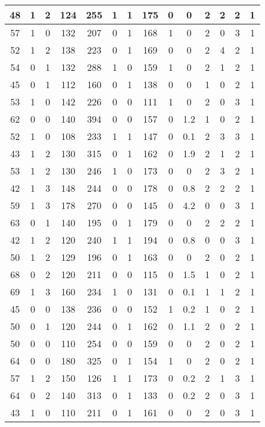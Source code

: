 \documentclass{article}
\begin{document}
\begin{longtable}{|c|c|c|c|c|c|c|c|c|c|c|c|c|c|}
48 & 1 & 2 & 124 & 255 & 1 & 1 & 175 & 0 & 0 & 2 & 2 & 2 & 1 \\ \hline
57 & 1 & 0 & 132 & 207 & 0 & 1 & 168 & 1 & 0 & 2 & 0 & 3 & 1 \\ \hline
52 & 1 & 2 & 138 & 223 & 0 & 1 & 169 & 0 & 0 & 2 & 4 & 2 & 1 \\ \hline
54 & 0 & 1 & 132 & 288 & 1 & 0 & 159 & 1 & 0 & 2 & 1 & 2 & 1 \\ \hline
45 & 0 & 1 & 112 & 160 & 0 & 1 & 138 & 0 & 0 & 1 & 0 & 2 & 1 \\ \hline
53 & 1 & 0 & 142 & 226 & 0 & 0 & 111 & 1 & 0 & 2 & 0 & 3 & 1 \\ \hline
62 & 0 & 0 & 140 & 394 & 0 & 0 & 157 & 0 & 1.2 & 1 & 0 & 2 & 1 \\ \hline
52 & 1 & 0 & 108 & 233 & 1 & 1 & 147 & 0 & 0.1 & 2 & 3 & 3 & 1 \\ \hline
43 & 1 & 2 & 130 & 315 & 0 & 1 & 162 & 0 & 1.9 & 2 & 1 & 2 & 1 \\ \hline
53 & 1 & 2 & 130 & 246 & 1 & 0 & 173 & 0 & 0 & 2 & 3 & 2 & 1 \\ \hline
42 & 1 & 3 & 148 & 244 & 0 & 0 & 178 & 0 & 0.8 & 2 & 2 & 2 & 1 \\ \hline
59 & 1 & 3 & 178 & 270 & 0 & 0 & 145 & 0 & 4.2 & 0 & 0 & 3 & 1 \\ \hline
63 & 0 & 1 & 140 & 195 & 0 & 1 & 179 & 0 & 0 & 2 & 2 & 2 & 1 \\ \hline
42 & 1 & 2 & 120 & 240 & 1 & 1 & 194 & 0 & 0.8 & 0 & 0 & 3 & 1 \\ \hline
50 & 1 & 2 & 129 & 196 & 0 & 1 & 163 & 0 & 0 & 2 & 0 & 2 & 1 \\ \hline
68 & 0 & 2 & 120 & 211 & 0 & 0 & 115 & 0 & 1.5 & 1 & 0 & 2 & 1 \\ \hline
69 & 1 & 3 & 160 & 234 & 1 & 0 & 131 & 0 & 0.1 & 1 & 1 & 2 & 1 \\ \hline
45 & 0 & 0 & 138 & 236 & 0 & 0 & 152 & 1 & 0.2 & 1 & 0 & 2 & 1 \\ \hline
50 & 0 & 1 & 120 & 244 & 0 & 1 & 162 & 0 & 1.1 & 2 & 0 & 2 & 1 \\ \hline
50 & 0 & 0 & 110 & 254 & 0 & 0 & 159 & 0 & 0 & 2 & 0 & 2 & 1 \\ \hline
64 & 0 & 0 & 180 & 325 & 0 & 1 & 154 & 1 & 0 & 2 & 0 & 2 & 1 \\ \hline
57 & 1 & 2 & 150 & 126 & 1 & 1 & 173 & 0 & 0.2 & 2 & 1 & 3 & 1 \\ \hline
64 & 0 & 2 & 140 & 313 & 0 & 1 & 133 & 0 & 0.2 & 2 & 0 & 3 & 1 \\ \hline
43 & 1 & 0 & 110 & 211 & 0 & 1 & 161 & 0 & 0 & 2 & 0 & 3 & 1 \\ \hline

\end{longtable}
\end{document}
